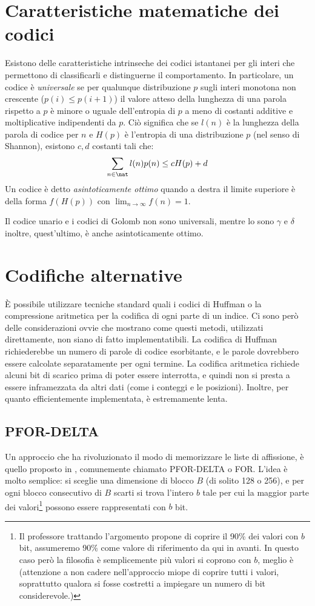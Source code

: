 \section{Caratteristiche matematiche dei codici}
Esistono delle caratteristiche intrinseche dei codici istantanei per gli interi che permettono di classificarli e distinguerne il comportamento. In particolare, un codice è \textit{universale} se per qualunque distribuzione $p$ sugli interi monotona non crescente ($p(i) \leq p(i + 1)$) il valore atteso della lunghezza di una parola rispetto a $p$ è minore o uguale dell'entropia di $p$ a meno di costanti additive e moltiplicative indipendenti da $p$. Ciò significa che se $l(n)$ è la lunghezza della parola di codice per $n$ e $H(p)$ è l'entropia di una distribuzione $p$ (nel senso di Shannon), esistono $c, d$ costanti tali che:
\begin{equation}
	\sum_{n \in \nat}{l(n)p(n)} \leq cH(p) + d
\end{equation}
Un codice è detto \textit{asintoticamente ottimo} quando a destra il limite superiore è della forma $f(H(p))$ con $\lim_{n \to \infty} f(n) = 1$.

Il codice unario e i codici di Golomb non sono universali, mentre lo sono $\gamma$ e $\delta$ inoltre, quest'ultimo, è anche asintoticamente ottimo.
\section{Codifiche alternative}
È possibile utilizzare tecniche standard quali i codici di Huffman o la compressione aritmetica per la codifica di ogni parte di un indice. Ci sono però delle considerazioni ovvie che mostrano come questi metodi, utilizzati direttamente, non siano di fatto implementatibili. La codifica di Huffman richiederebbe un numero di parole di codice esorbitante, e le parole dovrebbero essere calcolate separatamente per ogni termine. La codifica aritmetica richiede alcuni bit di scarico prima di poter essere interrotta, e quindi non si presta a essere inframezzata da altri dati (come i conteggi e le posizioni). Inoltre, per quanto efficientemente implementata, è estremamente lenta.
\subsection{PFOR-DELTA}
Un approccio che ha rivoluzionato il modo di memorizzare le liste di affissione, è quello proposto in \cite{pfordelta}, comunemente chiamato PFOR-DELTA o FOR. L'idea è molto semplice: si sceglie una dimensione di blocco $B$ (di solito 128 o 256), e per ogni blocco consecutivo di $B$ scarti si trova l'intero $b$ tale per cui la maggior parte dei valori\footnote{Il professore trattando l'argomento propone di coprire il 90\% dei valori con $b$ bit, assumeremo 90\% come valore di riferimento da qui in avanti. In questo caso però la filosofia è semplicemente più valori si coprono con $b$, meglio è (attenzione a non cadere nell'approccio miope di coprire tutti i valori, soprattutto qualora si fosse costretti a impiegare un numero di bit considerevole.)} possono essere rappresentati con $b$ bit.

